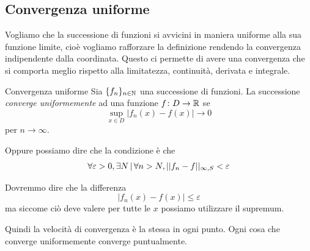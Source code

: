 \documentclass[a4paper]{article}
\begin{document}
\subsection{Convergenza uniforme}

\begin{radioactive}
    Vogliamo che la successione di funzioni si avvicini in maniera uniforme
    alla sua funzione limite, cioè vogliamo rafforzare la definizione
    rendendo la convergenza indipendente dalla coordinata.
    Questo ci permette di avere una convergenza che si comporta meglio rispetto alla limitatezza,
    continuità, derivata e integrale.
\end{radioactive}

\begin{radioactive}
    \begin{snippetdefinition}{Convergenza uniforme}
        Sia \(\{f_n\}_{n\in\mathbb{N}}\) una successione di funzioni.
        La successione \emph{converge uniformemente} ad una funzione \(f\colon D \to \mathbb{R}\) se
        \[
            \sup_{x\in D} \left| f_n(x) - f(x) \right| \to 0
        \]
        per \(n\to\infty\).
    \end{snippetdefinition}
\end{radioactive}

\begin{radioactive}
    Oppure possiamo dire che la condizione è che
    \[
        \forall \varepsilon > 0, \exists N \,|\, \forall n>N, ||f_n-f||_{\infty, S} < \varepsilon
    \]

    Dovremmo dire che la differenza
    \[
        |f_n(x) - f(x)| \leq \varepsilon
    \]
    ma siccome ciò deve valere per tutte le \(x\) possiamo utilizzare il supremum.

    Quindi la velocità di convergenza è la stessa in ogni punto.
    Ogni cosa che converge uniformemente converge puntualmente.
\end{radioactive}
\end{document}
